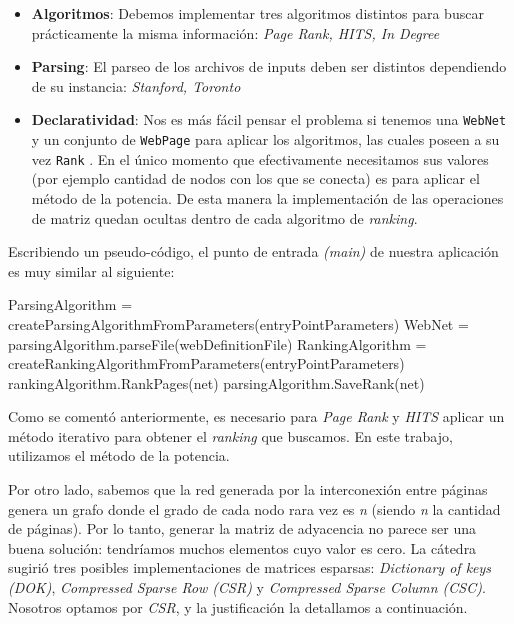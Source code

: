 	\begin{itemize}
		\item \textbf{Algoritmos}: Debemos implementar tres algoritmos distintos para buscar prácticamente la misma información: \textit{Page Rank, HITS, In Degree}
		\item \textbf{Parsing}: El parseo de los archivos de inputs deben ser distintos dependiendo de su instancia: \textit{Stanford, Toronto}
		\item \textbf{Declaratividad}: Nos es más fácil pensar el problema si tenemos una \texttt{WebNet} y un conjunto de \texttt{WebPage} para aplicar los algoritmos, las cuales poseen a su vez \texttt{Rank} . En el único momento que efectivamente necesitamos sus valores (por ejemplo cantidad de nodos con los que se conecta) es para aplicar el método de la potencia. De esta manera la implementación de las operaciones de matriz quedan ocultas dentro de cada algoritmo de \textit{ranking}.
	\end{itemize}

	Escribiendo un pseudo-código, el punto de entrada \textit{(main)} de nuestra aplicación es muy similar al siguiente:

	\vspace{\baselineskip}
	\begin{codebox}
	\li ParsingAlgorithm  = createParsingAlgorithmFromParameters(entryPointParameters)
	\li WebNet  = parsingAlgorithm.parseFile(webDefinitionFile)
	\li RankingAlgorithm  = createRankingAlgorithmFromParameters(entryPointParameters)
	\li rankingAlgorithm.RankPages(net)
	\li parsingAlgorithm.SaveRank(net)
	\End
	\end{codebox} 
	\vspace{\baselineskip}

	Como se comentó anteriormente, es necesario para \textit{Page Rank} y \textit{HITS} aplicar un método iterativo para obtener el \textit{ranking} que buscamos. En este trabajo, utilizamos el método de la potencia. 

	Por otro lado, sabemos que la red generada por la interconexión entre páginas genera un grafo donde el grado de cada nodo rara vez es \textit{n} (siendo \textit{n} la cantidad de páginas). Por lo tanto, generar la matriz de adyacencia no parece ser una buena solución: tendríamos muchos elementos cuyo valor es cero. La cátedra sugirió tres posibles implementaciones de matrices esparsas: \textit{Dictionary of keys (DOK)}, \textit{Compressed Sparse Row (CSR)} y \textit{Compressed Sparse Column (CSC)}. Nosotros optamos por \textit{CSR}, y la justificación la detallamos a continuación.

